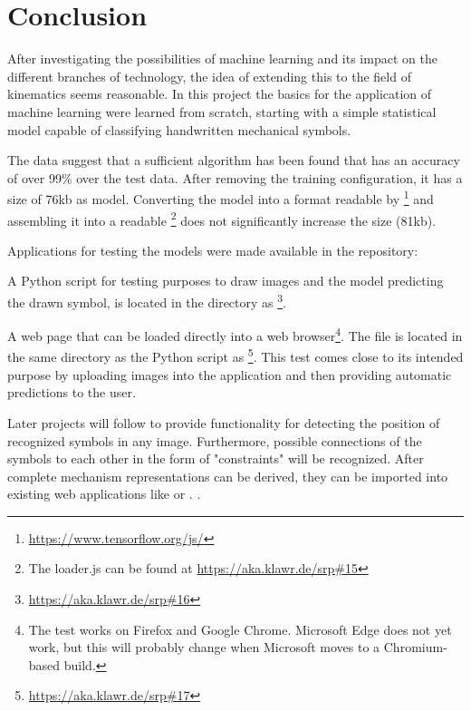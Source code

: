 \section{Conclusion}

After investigating the possibilities of machine learning and its impact on the different branches of technology, the idea of extending this to the field of kinematics seems reasonable.
In this project the basics for the application of machine learning were learned from scratch, starting with a simple statistical model capable of classifying handwritten mechanical symbols.

The data suggest that a sufficient algorithm has been found that has an accuracy of over 99\% over the test data.
After removing the training configuration, it has a size of 76kb as  model.
Converting the model into a format readable by \footnote{\url{https://www.tensorflow.org/js/}} and assembling it into a readable \footnote{The loader.js can be found at \url{https://aka.klawr.de/srp\#15}} does not significantly increase the size (81kb).

Applications for testing the models were made available in the repository:

A Python script for testing purposes to draw images and the model predicting the drawn symbol, is located in the  directory as \footnote{\url{https://aka.klawr.de/srp\#16}}.

A web page that can be loaded directly into a web browser\footnote{The test works on Firefox and Google Chrome. Microsoft Edge does not yet work, but this will probably change when Microsoft moves to a Chromium-based build. }.
The file is located in the same directory as the Python script as \footnote{\url{https://aka.klawr.de/srp\#17}}.
This test comes close to its intended purpose by uploading images into the application and then providing automatic predictions to the user.

Later projects will follow to provide functionality for detecting the position of recognized symbols in any image.
Furthermore, possible connections of the symbols to each other in the form of "constraints" will be recognized.
After complete mechanism representations can be derived, they can be imported into existing web applications like  \cite{Goessner2019, Goessner2019a, Goessner2019b} or . \cite{Uhlig2019, Uhlig2019a}.
